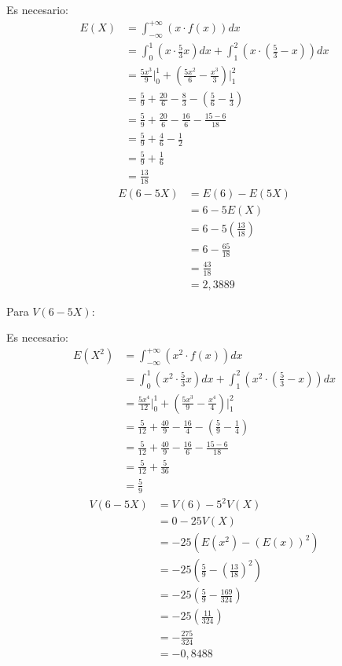 \documentclass{templateNote}
\begin{document}
Es necesario:
\begin{align*}
    E(X) &= \int_{-\infty}^{+\infty}{(x\cdot f(x))dx} \\
    &= \int_{0}^{1}{(x\cdot \frac{5}{3}x)dx} + \int_{1}^{2}{(x\cdot (\frac{5}{3} - x))dx} \\
    &= \frac{5x^3}{9}\Big|_{0}^{1} + \left(\frac{5x^2}{6} - \frac{x^3}{3}\right)\Big|_{1}^{2} \\
    &= \frac{5}{9} + \frac{20}{6} - \frac{8}{3} - \left(\frac{5}{6} - \frac{1}{3}\right) \\
    &= \frac{5}{9} + \frac{20}{6} - \frac{16}{6} - \frac{15-6}{18} \\
    &= \frac{5}{9} + \frac{4}{6} - \frac{1}{2} \\
    &= \frac{5}{9} + \frac{1}{6} \\
    &= \frac{13}{18}
\end{align*}
\begin{align*}
    E(6-5X) &= E(6) - E(5X) \\
    &= 6 - 5E(X) \\
    &= 6 - 5 \left(\frac{13}{18}\right) \\
    &= 6 - \frac{65}{18}\\
    &= \frac{43}{18} \\
    &= 2,3889
\end{align*}

Para $V(6-5X)$:

Es necesario:
\begin{align*}
    E(X^2) &= \int_{-\infty}^{+\infty}{(x^2\cdot f(x))dx} \\
    &= \int_{0}^{1}{(x^2\cdot \frac{5}{3}x)dx} + \int_{1}^{2}{(x^2\cdot (\frac{5}{3} - x))dx} \\
    &= \frac{5x^4}{12}\Big|_{0}^{1} + \left(\frac{5x^3}{9} - \frac{x^4}{4}\right)\Big|_{1}^{2} \\
    &= \frac{5}{12} + \frac{40}{9} - \frac{16}{4} - \left(\frac{5}{9} - \frac{1}{4}\right) \\
    &= \frac{5}{12} + \frac{40}{9} - \frac{16}{6} - \frac{15-6}{18} \\
    &= \frac{5}{12} + \frac{5}{36} \\
    &= \frac{5}{9}
\end{align*}
\begin{align*}
    V(6-5X) &= V(6) - 5^2V(X) \\
    &= 0 - 25 V(X) \\
    &= - 25 \left(E(x^2) - (E(x))^2\right) \\
    &= -25 \left(\frac{5}{9} - \left(\frac{13}{18}\right)^2\right) \\
    &= -25 \left(\frac{5}{9} - \frac{169}{324}\right) \\
    &= -25 \left(\frac{11}{324}\right) \\
    &= - \frac{275}{324} \\
    &= -0,8488
\end{align*}
\end{document}
